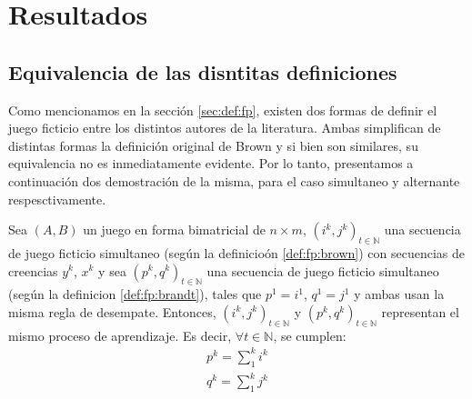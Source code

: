 \chapter{Resultados}  \label{cap:aportes}

\section{Equivalencia de las disntitas definiciones}

Como mencionamos en la sección \ref{sec:def:fp}, existen dos formas de definir el juego ficticio entre los distintos autores de la literatura. Ambas simplifican de distintas formas la definición original de Brown y si bien son similares, su equivalencia no es inmediatamente evidente. Por lo tanto, presentamos a continuación dos demostración de la misma, para el caso simultaneo y alternante respesctivamente.

\begin{theorem}
    Sea $(A, B)$ un juego en forma bimatricial de $n \times m$, $(i^k, j^k)_{t \in \mathbb{N}}$ una secuencia de juego ficticio simultaneo (según la definicioón \ref{def:fp:brown}) con secuencias de creencias $y^k$, $x^k$ y sea $(p^k, q^k)_{t \in \mathbb{N}}$ una secuencia de juego ficticio simultaneo (según la definicion \ref{def:fp:brandt}), tales que $p^1 = i^1$, $q^1 = j^1$ y ambas usan la misma regla de desempate. Entonces, $(i^k, j^k)_{t \in \mathbb{N}}$ y $(p^k, q^k)_{t \in \mathbb{N}}$ representan el mismo proceso de aprendizaje. Es decir, $\forall t \in \mathbb{N}$, se cumplen:
    \begin{gather}
        p^{k} = \sum_1^k{i^k} \\
        q^{k} = \sum_1^k{j^k}
    \end{gather}
\end{theorem}

